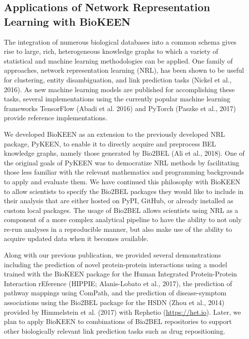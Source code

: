 \subsection*{Applications of Network Representation Learning with BioKEEN}

The integration of numerous biological databases into a common schema gives rise to large, rich, heterogeneous knowledge graphs to which a variety of statistical and machine learning methodologies can be applied.
One family of approaches, network representation learning (NRL), has been shown to be useful for clustering, entity disambiguation, and link prediction tasks (Nickel et al., 2016).
As new machine learning models are published for accomplishing these tasks, several implementations using the currently popular machine learning frameworks TensorFlow (Abadi et al. 2016) and PyTorch (Paszke et al., 2017) provide reference implementations.

We developed BioKEEN as an extension to the previously developed NRL package, PyKEEN, to enable it to directly acquire and preprocess BEL knowledge graphs, namely those generated by Bio2BEL (Ali et al., 2018).
One of the original goals of PyKEEN was to democratize NRL methods by facilitating those less familiar with the relevant mathematics and programming backgrounds to apply and evaluate them. We have continued this philosophy with BioKEEN to allow scientists to specify the Bio2BEL packages they would like to include in their analysis that are either hosted on PyPI, GitHub, or already installed as custom local packages. The usage of Bio2BEL allows scientists using NRL as a component of a more complex analytical pipeline to have the ability to not only re-run analyses in a reproducible manner, but also make use of the ability to acquire updated data when it becomes available.

Along with our previous publication, we provided several demonstrations including the prediction of novel protein-protein interactions using a model trained with the BioKEEN package for the Human Integrated Protein-Protein Interaction rEference (HIPPIE; Alanis-Lobato et al., 2017), the prediction of pathway mappings using ComPath, and the prediction of disease-symptom associations using the Bio2BEL package for the HSDN (Zhou et al., 2014) provided by Himmelstein et al. (2017) with Rephetio (\url{https://het.io}).
Later, we plan to apply BioKEEN to combinations of Bio2BEL repositories to support other biologically relevant link prediction tasks such as drug repositioning.

